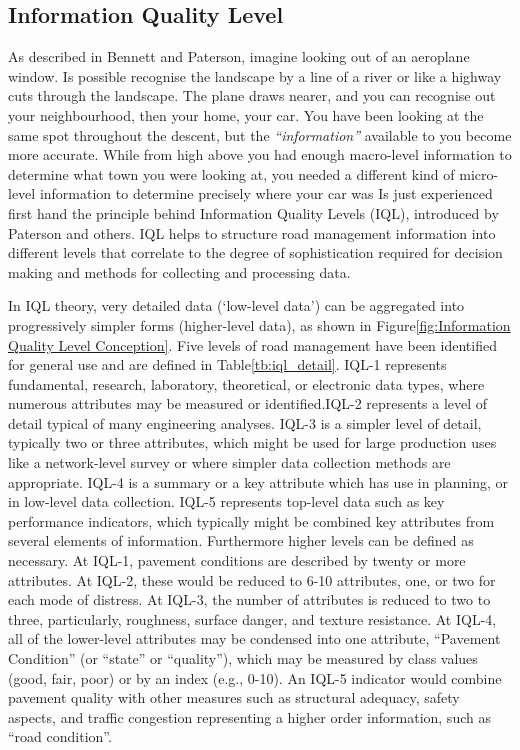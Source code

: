 \documentclass[tesi]{subfiles}
\begin{document}
\subsection{Information Quality Level}\label{ssc:Information Quality Level}
As described in Bennett and Paterson\cite{bennett2000guide}, imagine looking out of an aeroplane window. Is possible recognise the landscape by a line of a river or like a highway cuts through the landscape. The plane draws nearer, and you can recognise out your neighbourhood, then your home, your car. You have been looking at the same spot throughout the descent, but the \textit{“information”} available to you become more accurate. While from high above you had enough macro-level information to determine what town you were looking at, you needed a different kind of micro-level information to determine precisely where your car was
Is just experienced first hand the principle behind Information Quality Levels (IQL), introduced by Paterson and others\cite{paterson2}. IQL helps to structure road management information into different levels that correlate to the degree of sophistication required for decision making and methods for collecting and processing data.


In IQL theory, very detailed data (‘low-level data’) can be aggregated into progressively simpler forms (higher-level data), as shown in Figure\ref{fig:Information Quality Level Conception}. Five levels of road management have been identified for general use and are defined in Table\ref{tb:iql_detail}.
IQL-1 represents fundamental, research, laboratory, theoretical, or electronic data types, where numerous attributes may be measured or identified.IQL-2 represents a level of detail typical of many engineering analyses.
IQL-3 is a simpler level of detail, typically two or three attributes, which might be used for large production uses like a network-level survey or where simpler data collection methods are appropriate.
IQL-4 is a summary or a key attribute which has use in planning, or in low-level data collection.
IQL-5 represents top-level data such as key performance indicators, which typically might be combined key attributes from several elements of information. Furthermore higher levels can be defined as necessary. 
At IQL-1, pavement conditions are described by twenty or more attributes.
At IQL-2, these would be reduced to 6-10 attributes, one, or two for each mode of distress.
 At IQL-3, the number of attributes is reduced to two to three, particularly, roughness, surface danger, and texture resistance.
At IQL-4, all of the lower-level attributes may be condensed into one attribute, “Pavement Condition” (or “state” or “quality”), which may be measured by class values (good, fair, poor) or by an index (e.g., 0-10).
An IQL-5 indicator would combine pavement quality with other measures such as structural adequacy, safety aspects, and traffic congestion representing a higher order information, such as “road condition”.
\end{document}
